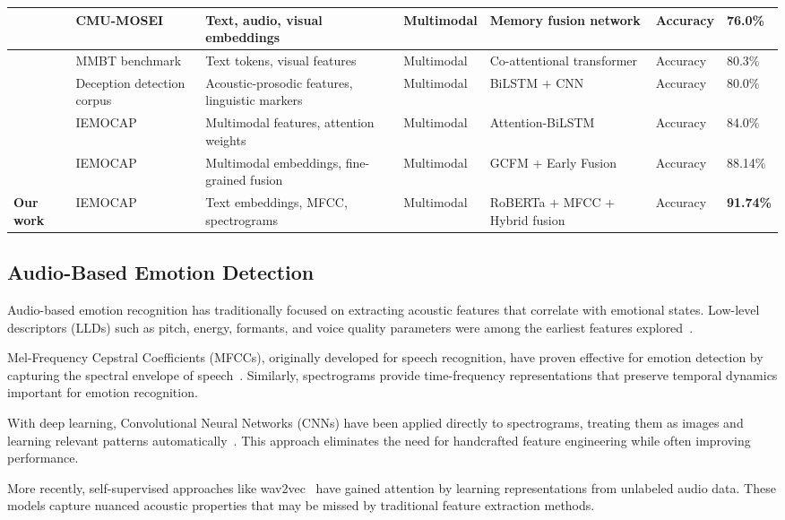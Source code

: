 \documentclass[12pt]{article}
\begin{document}
\begin{table}[h]
{\begin{tabular}{|p{0.8cm}|p{2.8cm}|p{4.5cm}|p{2.8cm}|p{3.5cm}|p{1.5cm}|p{1.5cm}|}
\hline
\cite{zadeh2018memory} & CMU-MOSEI & Text, audio, visual embeddings & Multimodal & Memory fusion network & Accuracy & 76.0\% \\
\hline
\cite{kiela2019supervised} & MMBT benchmark & Text tokens, visual features & Multimodal & Co-attentional transformer & Accuracy & 80.3\% \\
\hline
\cite{sehrawat2023deception} & Deception detection corpus & Acoustic-prosodic features, linguistic markers & Multimodal & BiLSTM + CNN & Accuracy & 80.0\% \\
\hline
\cite{hsiao2022attention} & IEMOCAP & Multimodal features, attention weights & Multimodal & Attention-BiLSTM & Accuracy & 84.0\% \\
\hline
\cite{zhang2022fine} & IEMOCAP & Multimodal embeddings, fine-grained fusion & Multimodal & GCFM + Early Fusion & Accuracy & 88.14\% \\
\hline
\textbf{Our work} & IEMOCAP & Text embeddings, MFCC, spectrograms & Multimodal & RoBERTa + MFCC + Hybrid fusion & Accuracy & \textbf{91.74\%} \\
\hline
\end{tabular}%
}
\end{table}

\subsection{Audio-Based Emotion Detection}
Audio-based emotion recognition has traditionally focused on extracting acoustic features that correlate with emotional states. Low-level descriptors (LLDs) such as pitch, energy, formants, and voice quality parameters were among the earliest features explored~\cite{schuller2009acoustic}.

Mel-Frequency Cepstral Coefficients (MFCCs), originally developed for speech recognition, have proven effective for emotion detection by capturing the spectral envelope of speech~\cite{li2013speech}. Similarly, spectrograms provide time-frequency representations that preserve temporal dynamics important for emotion recognition.

With deep learning, Convolutional Neural Networks (CNNs) have been applied directly to spectrograms, treating them as images and learning relevant patterns automatically~\cite{mao2014learning}. This approach eliminates the need for handcrafted feature engineering while often improving performance.

More recently, self-supervised approaches like wav2vec~\cite{schneider2019wav2vec} have gained attention by learning representations from unlabeled audio data. These models capture nuanced acoustic properties that may be missed by traditional feature extraction methods.
\end{document}
